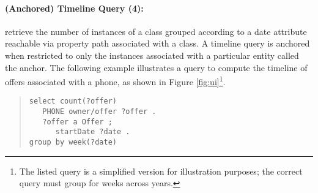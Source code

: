 \paragraph{(Anchored) Timeline Query (4):} retrieve the number of instances of a class grouped according to a date attribute reachable via property path associated with a class.
A timeline query is anchored when restricted to only the instances associated with a particular entity called the anchor.
The following example illustrates a query to compute the timeline of offers associated with a phone, as shown in Figure \ref{fig:ui}\footnote{The listed query is a simplified version for illustration purposes; the correct query must group for weeks across years.}.
\begin{quote}
{\footnotesize
\begin{verbatim}
select count(?offer)
   PHONE owner/offer ?offer .
   ?offer a Offer ;
      startDate ?date .
group by week(?date)
\end{verbatim}}
\end{quote}
